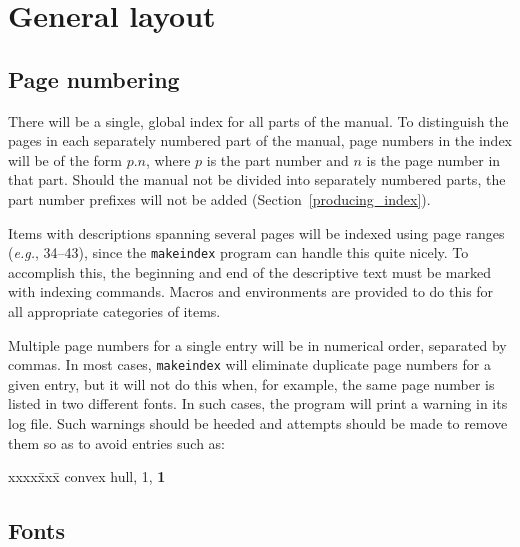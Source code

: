 \documentclass{article}
\newenvironment{indexex}{\begin{tabbing}
xxxx\=xxx\=\kill}{\end{tabbing}}
\begin{document}

\section{General layout}
\label{layout}

\subsection{Page numbering}%
\label{page_numbering}

There will be a single, global index for all parts of the manual.
To distinguish the pages in each separately numbered part of the manual,
page numbers in the index will be of the form $p.n$, where $p$ is the part 
number and $n$ is the page number in that part.  Should 
the manual not
be divided into separately numbered parts, the part number prefixes will 
not be added (Section~\ref{producing_index}).

Items with descriptions spanning several pages will be indexed using page 
ranges ({\it e.g.}, 34--43), since the {\tt makeindex} program can handle 
this quite nicely.
To accomplish this, the beginning and end of the descriptive
text must be marked with indexing commands.  Macros and environments
are provided to do this for all appropriate categories of items.

Multiple page numbers for a single entry will be in numerical order, separated
by commas.   In most cases, {\tt makeindex} will eliminate duplicate page
numbers for a given entry, but it will not do this when, for example,
the same page number is listed in two different fonts.  In such cases,
the program will print a warning in its log file. Such warnings should
be heeded and attempts should be made to remove them so as to avoid
entries such as:
\begin{indexex}
convex hull,   1, {\bf 1}
\end{indexex}%


\subsection{Fonts}%
\label{fonts}
\end{document}
